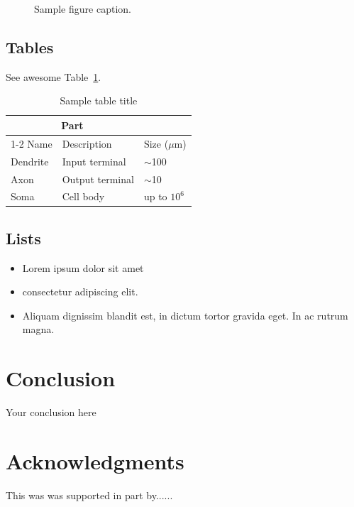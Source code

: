 \documentclass{article}
\begin{document}
\begin{figure}
  \centering
  \fbox{\rule[-.5cm]{4cm}{4cm} \rule[-.5cm]{4cm}{0cm}}
  \caption{Sample figure caption.}
  \label{fig:fig1}
\end{figure}

\subsection{Tables}
\lipsum[12]
See awesome Table~\ref{tab:table}.

\begin{table}
 \caption{Sample table title}
  \centering
  \begin{tabular}{lll}
    \toprule
    \multicolumn{2}{c}{Part}                   \\
    \cmidrule(r){1-2}
    Name     & Description     & Size ($\mu$m) \\
    \midrule
    Dendrite & Input terminal  & $\sim$100     \\
    Axon     & Output terminal & $\sim$10      \\
    Soma     & Cell body       & up to $10^6$  \\
    \bottomrule
  \end{tabular}
  \label{tab:table}
\end{table}

\subsection{Lists}
\begin{itemize}
\item Lorem ipsum dolor sit amet
\item consectetur adipiscing elit. 
\item Aliquam dignissim blandit est, in dictum tortor gravida eget. In ac rutrum magna.
\end{itemize}


\section{Conclusion}
Your conclusion here

\section*{Acknowledgments}
This was was supported in part by......

  
  
\end{document}
